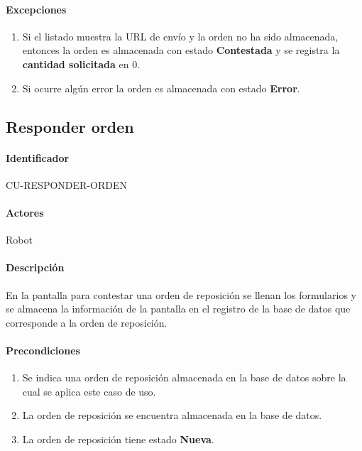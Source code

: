 \paragraph{Excepciones}
\begin{enumerate}
  \item Si el listado muestra la URL de envío y la orden no ha sido almacenada, entonces la orden es almacenada con estado \textbf{Contestada} y se registra la \textbf{cantidad solicitada} en 0.
  \item Si ocurre algún error la orden es almacenada con estado \textbf{Error}.
\end{enumerate}


\subsection{Responder orden}\label{cu-responder-orden}
\paragraph{Identificador}\label{cu-responder-orden}
CU-RESPONDER-ORDEN
\paragraph{Actores}
Robot
\paragraph{Descripción}
En la pantalla para contestar una orden de reposición se llenan los formularios y se almacena la información de la pantalla en el registro de la base de datos que corresponde a la orden de reposición.
\paragraph{Precondiciones}
\begin{enumerate}
  \item Se indica una orden de reposición almacenada en la base de datos sobre la cual se aplica este caso de uso.
  \item La orden de reposición se encuentra almacenada en la base de datos.
  \item La orden de reposición tiene estado \textbf{Nueva}.
\end{enumerate}
